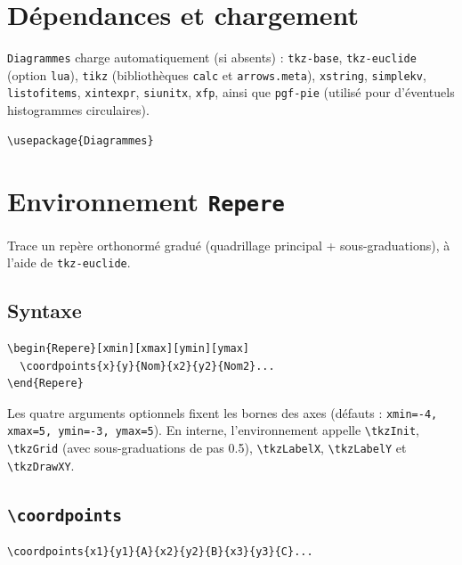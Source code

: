 \documentclass[11pt,a4paper]{article}
\newcommand{\pkg}[1]{\texttt{#1}}
\newcommand{\cmdname}[1]{\texttt{\textbackslash#1}}
\begin{document}
\section{Dépendances et chargement}

\pkg{Diagrammes} charge automatiquement (si absents) :
\pkg{tkz-base}, \pkg{tkz-euclide} (option \texttt{lua}), \pkg{tikz} (bibliothèques \texttt{calc} et \texttt{arrows.meta}), \pkg{xstring}, \pkg{simplekv}, \pkg{listofitems}, \pkg{xintexpr}, \pkg{siunitx}, \pkg{xfp}, ainsi que \pkg{pgf-pie} (utilisé pour d'éventuels histogrammes circulaires).

\begin{lstlisting}
\usepackage{Diagrammes}
\end{lstlisting}

\section{Environnement \texttt{Repere}}

Trace un repère orthonormé gradué (quadrillage principal + sous-graduations), à l'aide de \pkg{tkz-euclide}.

\subsection{Syntaxe}

\begin{lstlisting}
\begin{Repere}[xmin][xmax][ymin][ymax]
  \coordpoints{x}{y}{Nom}{x2}{y2}{Nom2}...
\end{Repere}
\end{lstlisting}

Les quatre arguments optionnels fixent les bornes des axes (défauts : \texttt{xmin=-4, xmax=5, ymin=-3, ymax=5}). En interne, l'environnement appelle \texttt{\textbackslash tkzInit}, \texttt{\textbackslash tkzGrid} (avec sous-graduations de pas 0.5), \texttt{\textbackslash tkzLabelX}, \texttt{\textbackslash tkzLabelY} et \texttt{\textbackslash tkzDrawXY}.

\subsection{\cmdname{coordpoints}}

\begin{lstlisting}
\coordpoints{x1}{y1}{A}{x2}{y2}{B}{x3}{y3}{C}...
\end{lstlisting}
\end{document}
